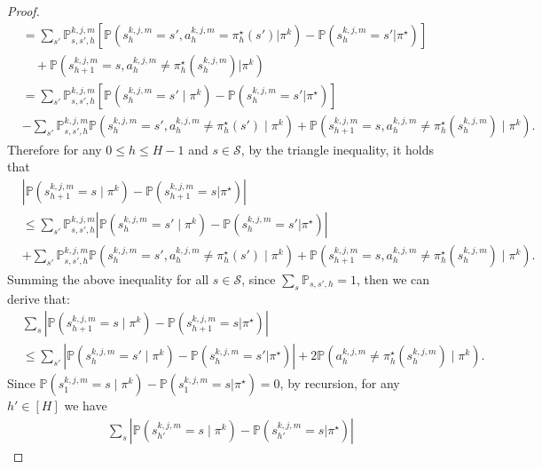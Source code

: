 \documentclass{article}
\begin{document}
\begin{proof}
\begin{align*}
& = \sum_{s'} \mathbb{P}_{s,s',h}^{k,j,m} \left[\mathbb{P}\left(s_h^{k,j,m} = s', a_h^{k,j,m} = \pi_h^{\star}(s') | \pi^k\right) - \mathbb{P}\left(s_h^{k,j,m} = s'|\pi^{\star}\right)\right] \nonumber\\
&\quad + \mathbb{P}\left(s_{h+1}^{k,j,m} = s, a_h^{k,j,m} \neq \pi_h^{\star}(s_{h}^{k,j,m}) | \pi^k\right) \nonumber\\
&
= \sum_{s'} \mathbb{P}_{s,s',h}^{k,j,m} \left[\mathbb{P}\left(s_h^{k,j,m} = s' \mid \pi^k\right) - \mathbb{P}\left(s_h^{k,j,m} = s'|\pi^{\star}\right)\right]   \nonumber\\
&
- \sum_{s'} \mathbb{P}_{s,s',h}^{k,j,m}\mathbb{P}\left(s_h^{k,j,m} = s', a_h^{k,j,m} \neq \pi_h^{\star}(s') \mid \pi^k\right) + \mathbb{P}\left(s_{h+1}^{k,j,m} = s, a_h^{k,j,m} \neq \pi_h^{\star}(s_{h}^{k,j,m}) \mid \pi^k\right).
\end{align*}
Therefore for any $0\leq h\leq H-1$ and $s \in \mathcal{S}$, by the triangle inequality, it holds that
\begin{align*}
    &\left|\mathbb{P}\left(s_{h+1}^{k,j,m} = s \mid \pi^k\right) - \mathbb{P}\left(s_{h+1}^{k,j,m} = s|\pi^{\star}\right)\right| 
\nonumber\\
&\leq \sum_{s'} \mathbb{P}_{s,s',h}^{k,j,m} \left|\mathbb{P}\left(s_h^{k,j,m} = s' \mid \pi^k\right) - \mathbb{P}\left(s_h^{k,j,m} = s'|\pi^{\star}\right)\right|  \nonumber\\
&+ \sum_{s'} \mathbb{P}_{s,s',h}^{k,j,m}\mathbb{P}\left(s_h^{k,j,m} = s', a_h^{k,j,m} \neq \pi_h^{\star}(s') \mid \pi^k\right) + \mathbb{P}\left(s_{h+1}^{k,j,m} = s, a_h^{k,j,m} \neq \pi_h^{\star}(s_{h}^{k,j,m}) \mid \pi^k\right).
\end{align*}
Summing the above inequality for all $s \in \mathcal{S}$, since $\sum_{s} \mathbb{P}_{s,s',h} = 1$, then we can derive that:
\begin{align*}
    &\sum_{s}\left|\mathbb{P}\left(s_{h+1}^{k,j,m} = s \mid \pi^k\right) - \mathbb{P}\left(s_{h+1}^{k,j,m} = s|\pi^{\star}\right)\right| \\
&\leq \sum_{s'} \left|\mathbb{P}\left(s_h^{k,j,m} = s' \mid \pi^k\right) - \mathbb{P}\left(s_h^{k,j,m} = s'|\pi^{\star} \right)\right| +  2\mathbb{P}\left(a_h^{k,j,m} \neq \pi_h^{\star}(s_h^{k,j,m}) \mid \pi^k\right) .
\end{align*}
Since $\mathbb{P}(s_{1}^{k,j,m} = s \mid \pi^k) - \mathbb{P}(s_{1}^{k,j,m} = s|\pi^{\star}) = 0$, by recursion, for any $h' \in [H]$ we have
\begin{align*}
    \sum_{s}\left|\mathbb{P}\left(s_{h'}^{k,j,m} = s \mid \pi^k\right) - \mathbb{P}\left(s_{h'}^{k,j,m} = s|\pi^{\star}\right)\right| 

\end{align*}
\end{proof}
\end{document}
